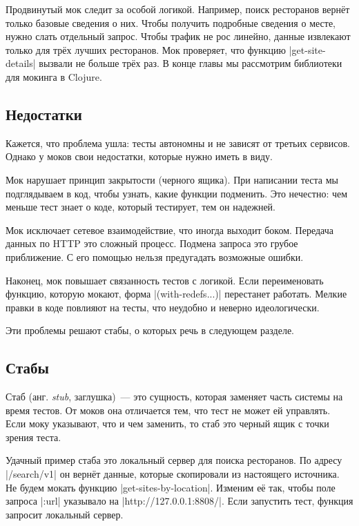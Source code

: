 Продвинутый мок следит за особой логикой. Например, поиск ресторанов вернёт
только базовые сведения о них. Чтобы получить подробные сведения о месте, нужно
слать отдельный запрос. Чтобы трафик не рос линейно, данные извлекают только для
трёх лучших ресторанов. Мок проверяет, что функцию \spverb|get-site-details|
вызвали не больше трёх раз. В конце главы мы рассмотрим библиотеки для мокинга в
Clojure.

\subsection{Недостатки}

Кажется, что проблема ушла: тесты автономны и не зависят от третьих
сервисов. Однако у моков свои недостатки, которые нужно иметь в виду.

Мок нарушает принцип закрытости (черного ящика). При написании теста мы
подглядываем в код, чтобы узнать, какие функции подменить. Это нечестно: чем
меньше тест знает о коде, который тестирует, тем он надежней.

Мок исключает сетевое взаимодействие, что иногда выходит боком. Передача данных
по HTTP это сложный процесс. Подмена запроса это грубое приближение. С его
помощью нельзя предугадать возможные ошибки.

Наконец, мок повышает связанность тестов с логикой. Если переименовать функцию,
которую мокают, форма \spverb|(with-redefs...)| перестанет работать. Мелкие
правки в коде повлияют на тесты, что неудобно и неверно идеологически.

Эти проблемы решают стабы, о которых речь в следующем разделе.

\subsection{Стабы}


Стаб (анг. \emph{stub}, заглушка)~--- это сущность, которая заменяет часть
системы на время тестов. От моков она отличается тем, что тест не может ей
управлять. Если моку указывают, что и чем заменить, то стаб это черный ящик с
точки зрения теста.

Удачный пример стаба это локальный сервер для поиска ресторанов. По адресу
\spverb|/search/v1| он вернёт данные, которые скопировали из настоящего
источника. Не будем мокать функцию \spverb|get-sites-by-location|. Изменим её
так, чтобы поле запроса \spverb|:url| указывало на
\spverb|http://127.0.0.1:8808/|.  Если запустить тест, функция запросит
локальный сервер.

